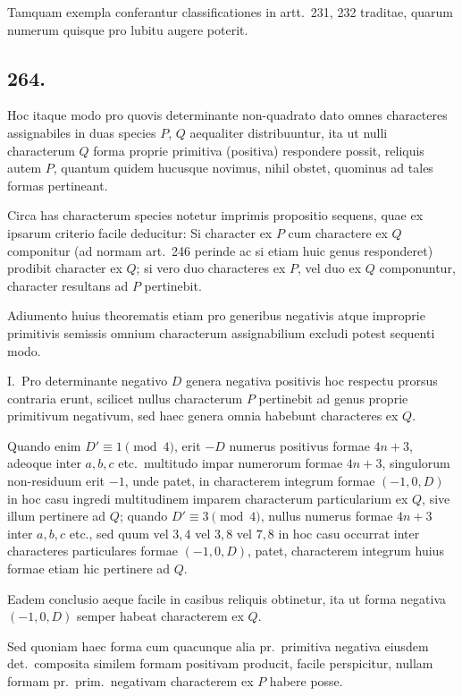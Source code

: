 \documentclass[12pt,a4paper]{article}
\theoremstyle{plain}
\theoremstyle{definition}
\theoremstyle{remark}
\begin{document}
Tamquam exempla conferantur classificationes in artt.\ 231, 232 traditae, quarum numerum quisque pro lubitu augere poterit.

\subsection*{264.}

Hoc itaque modo pro quovis determinante non-quadrato dato omnes characteres assignabiles in duas species $P$, $Q$ aequaliter distribuuntur, ita ut nulli characterum $Q$ forma proprie primitiva (positiva) respondere possit, reliquis autem $P$, quantum quidem hucusque novimus, nihil obstet, quominus ad tales formas pertineant.

Circa has characterum species notetur imprimis propositio sequens, quae ex ipsarum criterio facile deducitur: Si character ex $P$ cum charactere ex $Q$ componitur (ad normam art.\ 246 perinde ac si etiam huic genus responderet) prodibit character ex $Q$; si vero duo characteres ex $P$, vel duo ex $Q$ componuntur, character resultans ad $P$ pertinebit.

Adiumento huius theorematis etiam pro generibus negativis atque improprie primitivis semissis omnium characterum assignabilium excludi potest sequenti modo.

\textsc{I.}\ Pro determinante negativo $D$ genera negativa positivis hoc respectu prorsus contraria erunt, scilicet nullus characterum $P$ pertinebit ad genus proprie primitivum negativum, sed haec genera omnia habebunt characteres ex $Q$.

Quando enim $D' \equiv 1 \pmod{4}$, erit $-D$ numerus positivus formae $4n+3$, adeoque inter $a,b,c$ etc.\ multitudo impar numerorum formae $4n+3$, singulorum non-residuum erit $-1$, unde patet, in characterem integrum formae $(-1,0,D)$ in hoc casu ingredi multitudinem imparem characterum particularium ex $Q$, sive illum pertinere ad $Q$; quando $D' \equiv 3 \pmod{4}$, nullus numerus formae $4n+3$ inter $a,b,c$ etc., sed quum vel $3,4$ vel $3,8$ vel $7,8$ in hoc casu occurrat inter characteres particulares formae $(-1,0,D)$, patet, characterem integrum huius formae etiam hic pertinere ad $Q$.

Eadem conclusio aeque facile in casibus reliquis obtinetur, ita ut forma negativa $(-1,0,D)$ semper habeat characterem ex $Q$.

Sed quoniam haec forma cum quacunque alia pr.\ primitiva negativa eiusdem det.\ composita similem formam positivam producit, facile perspicitur, nullam formam pr.\ prim.\ negativam characterem ex $P$ habere posse.
\end{document}
